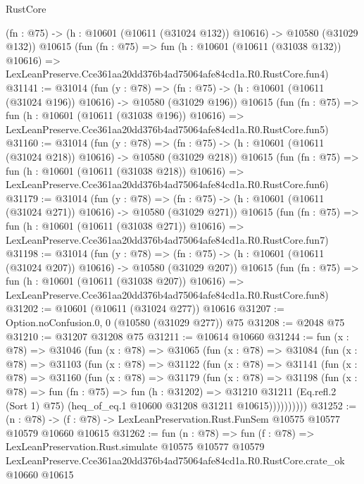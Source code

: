 \begin{lexlean}{RustCore}
\begin{coremodule}
    (fn : @75) -> (h : @10601 (@10611 (@31024 @132)) @10616) -> @10580 (@31029 @132))
    @10615
    (fun (fn : @75) =>
    fun (h : @10601 (@10611 (@31038 @132)) @10616) =>
    LexLeanPreserve.Cce361aa20dd376b4ad75064afe84cd1a.R0.RustCore.fun4)
@31141 := @31014
    (fun (y : @78) =>
    (fn : @75) -> (h : @10601 (@10611 (@31024 @196)) @10616) -> @10580 (@31029 @196))
    @10615
    (fun (fn : @75) =>
    fun (h : @10601 (@10611 (@31038 @196)) @10616) =>
    LexLeanPreserve.Cce361aa20dd376b4ad75064afe84cd1a.R0.RustCore.fun5)
@31160 := @31014
    (fun (y : @78) =>
    (fn : @75) -> (h : @10601 (@10611 (@31024 @218)) @10616) -> @10580 (@31029 @218))
    @10615
    (fun (fn : @75) =>
    fun (h : @10601 (@10611 (@31038 @218)) @10616) =>
    LexLeanPreserve.Cce361aa20dd376b4ad75064afe84cd1a.R0.RustCore.fun6)
@31179 := @31014
    (fun (y : @78) =>
    (fn : @75) -> (h : @10601 (@10611 (@31024 @271)) @10616) -> @10580 (@31029 @271))
    @10615
    (fun (fn : @75) =>
    fun (h : @10601 (@10611 (@31038 @271)) @10616) =>
    LexLeanPreserve.Cce361aa20dd376b4ad75064afe84cd1a.R0.RustCore.fun7)
@31198 := @31014
    (fun (y : @78) =>
    (fn : @75) -> (h : @10601 (@10611 (@31024 @207)) @10616) -> @10580 (@31029 @207))
    @10615
    (fun (fn : @75) =>
    fun (h : @10601 (@10611 (@31038 @207)) @10616) =>
    LexLeanPreserve.Cce361aa20dd376b4ad75064afe84cd1a.R0.RustCore.fun8)
@31202 := @10601 (@10611 (@31024 @277)) @10616
@31207 := Option.noConfusion.{0, 0} (@10580 (@31029 @277)) @75
@31208 := @2048 @75
@31210 := @31207 @31208 @75
@31211 := @10614 @10660
@31244 := fun (x : @78) =>
  @31046
    (fun (x : @78) =>
    @31065
      (fun (x : @78) =>
      @31084
        (fun (x : @78) =>
        @31103
          (fun (x : @78) =>
          @31122
            (fun (x : @78) =>
            @31141
              (fun (x : @78) =>
              @31160
                (fun (x : @78) =>
                @31179
                  (fun (x : @78) =>
                  @31198
                    (fun (x : @78) =>
                    fun (fn : @75) =>
                    fun (h : @31202) =>
                    @31210
                      @31211
                      (Eq.refl.{2} (Sort 1) @75)
                      (heq_of_eq.{1} @10600 @31208 @31211 @10615))))))))))
@31252 := (n : @78) ->
  (f : @78) -> LexLeanPreservation.Rust.FunSem @10575 @10577 @10579 @10660 @10615
@31262 := fun (n : @78) =>
  fun (f : @78) =>
  LexLeanPreservation.Rust.simulate
    @10575
    @10577
    @10579
    LexLeanPreserve.Cce361aa20dd376b4ad75064afe84cd1a.R0.RustCore.crate_ok
    @10660
    @10615
\end{coremodule}
\end{lexlean}
